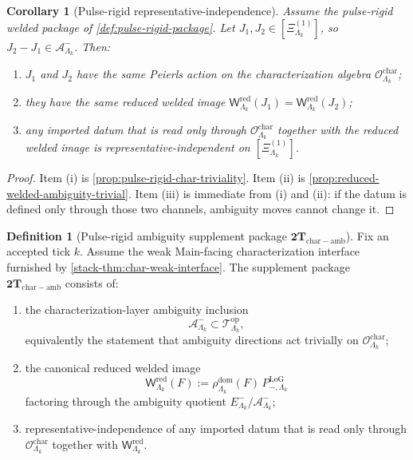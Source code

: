 \documentclass[11pt]{article}
\newtheorem{corollary}[theorem]{Corollary}
\theoremstyle{definition}
\newtheorem{definition}[theorem]{Definition}
\begin{document}
\begin{corollary}[Pulse-rigid representative-independence]
\label{cor:pulse-rigid-representative-independence}
Assume the pulse-rigid welded package of \cref{def:pulse-rigid-package}.
Let \(J_1,J_2\in[\Xi^{(1)}_{\Lambda_k}]\), so \(J_2-J_1\in\mathcal A^-_{\Lambda_k}\).
Then:
\begin{enumerate}[leftmargin=2em,label=(\roman*)]
\item \(J_1\) and \(J_2\) have the same Peierls action on the characterization algebra
  \(\mathcal O^{\mathrm{char}}_{\Lambda_k}\);
\item they have the same reduced welded image
  \(
  \mathsf W^{\mathrm{red}}_{\Lambda_k}(J_1)=
  \mathsf W^{\mathrm{red}}_{\Lambda_k}(J_2)
  \);
\item any imported datum that is read only through
  \(\mathcal O^{\mathrm{char}}_{\Lambda_k}\) together with the reduced welded image is
  representative-independent on \([\Xi^{(1)}_{\Lambda_k}]\).
\end{enumerate}
\end{corollary}

\begin{proof}
Item (i) is \cref{prop:pulse-rigid-char-triviality}.
Item (ii) is \cref{prop:reduced-welded-ambiguity-trivial}.
Item (iii) is immediate from (i) and (ii): if the datum is defined only through those two channels,
ambiguity moves cannot change it.
\end{proof}

\begin{definition}[Pulse-rigid ambiguity supplement package \(\mathbf{2T}_{\mathrm{char\!-\!amb}}\)]
\label{def:2T-char-amb}
Fix an accepted tick \(k\).
Assume the weak Main-facing characterization interface furnished by
\cref{stack-thm:char-weak-interface}.
The supplement package
\(
\mathbf{2T}_{\mathrm{char\!-\!amb}}
\)
consists of:
\begin{enumerate}[leftmargin=2em,label=(A\arabic*)]
\item the characterization-layer ambiguity inclusion
  \[
  \mathcal A^-_{\Lambda_k}\subset\mathcal T^{\mathrm{op}}_{\Lambda_k},
  \]
  equivalently the statement that ambiguity directions act trivially on
  \(\mathcal O^{\mathrm{char}}_{\Lambda_k}\);
\item the canonical reduced welded image
  \[
  \mathsf W^{\mathrm{red}}_{\Lambda_k}(F)
  :=
  \rho^{\mathrm{dom}}_{\Lambda_k}(F)\,P_{-,\Lambda_k}^{\mathrm{LoG}}
  \]
  factoring through the ambiguity quotient \(E^-_{\Lambda_k}/\mathcal A^-_{\Lambda_k}\);
\item representative-independence of any imported datum that is read only through
  \(\mathcal O^{\mathrm{char}}_{\Lambda_k}\) together with
  \(\mathsf W^{\mathrm{red}}_{\Lambda_k}\).
\end{enumerate}
\end{definition}
\end{document}
